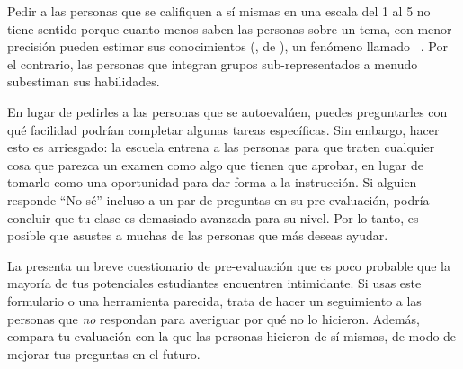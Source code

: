 Pedir a las personas que se califiquen a sí mismas en una escala del 1 al 5 no tiene sentido
porque cuanto menos saben las personas sobre un tema, 
con menor precisión pueden estimar sus conocimientos
(,
de ),
un fenómeno llamado ~\cite{Krug1999}.
Por el contrario,
las personas que integran grupos sub-representados a menudo subestiman sus habilidades.


En lugar de pedirles a las personas que se autoevalúen,
puedes preguntarles con qué facilidad podrían completar algunas tareas específicas.
Sin embargo,
hacer esto es arriesgado:
la escuela entrena a las personas
para que traten cualquier cosa que parezca un examen como algo que tienen que aprobar,
en lugar de tomarlo como una oportunidad para dar forma a la instrucción.
Si alguien responde ``No sé'' incluso a un par de preguntas en su pre-evaluación,
podría concluir que tu clase es demasiado avanzada para su nivel.
Por lo tanto, es posible que asustes a muchas de las personas que más deseas ayudar.

La  presenta un breve cuestionario de pre-evaluación
que es poco probable que la mayoría de tus potenciales estudiantes encuentren intimidante.
Si usas este formulario o una herramienta parecida,
trata de hacer un seguimiento a las personas que \emph{no} respondan para averiguar por qué no lo hicieron. 
Además, compara tu evaluación con la que las personas hicieron de sí mismas,
de modo de mejorar tus preguntas en el futuro.

